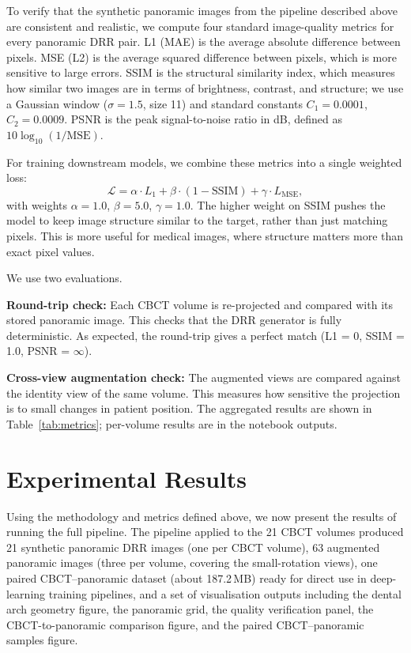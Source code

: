 \documentclass[conference]{IEEEtran}
\begin{document}
To verify that the synthetic panoramic images from the pipeline described above are consistent and realistic, we compute four standard image-quality metrics for every panoramic DRR pair. L1 (MAE) is the average absolute difference between pixels. MSE (L2) is the average squared difference between pixels, which is more sensitive to large errors. SSIM is the structural similarity index, which measures how similar two images are in terms of brightness, contrast, and structure; we use a Gaussian window ($\sigma=1.5$, size 11) and standard constants $C_1 = 0.0001$, $C_2 = 0.0009$. PSNR is the peak signal-to-noise ratio in dB, defined as $10\log_{10}(1/\text{MSE})$.

For training downstream models, we combine these metrics into a single weighted loss:
\begin{equation}
\mathcal{L} = \alpha \cdot L_1 + \beta \cdot (1 - \text{SSIM}) + \gamma \cdot L_\text{MSE},
\label{eq:loss}
\end{equation}
with weights $\alpha=1.0$, $\beta=5.0$, $\gamma=1.0$. The higher weight on SSIM pushes the model to keep image structure similar to the target, rather than just matching pixels. This is more useful for medical images, where structure matters more than exact pixel values.

We use two evaluations.

\textbf{Round-trip check:} Each CBCT volume is re-projected and compared with its stored panoramic image. This checks that the DRR generator is fully deterministic. As expected, the round-trip gives a perfect match (L1 = 0, SSIM = 1.0, PSNR = $\infty$).

\textbf{Cross-view augmentation check:} The augmented views are compared against the identity view of the same volume. This measures how sensitive the projection is to small changes in patient position. The aggregated results are shown in Table~\ref{tab:metrics}; per-volume results are in the notebook outputs.

\section{Experimental Results}
\label{sec:results}

Using the methodology and metrics defined above, we now present the results of running the full pipeline. The pipeline applied to the 21 CBCT volumes produced 21 synthetic panoramic DRR images (one per CBCT volume), 63 augmented panoramic images (three per volume, covering the small-rotation views), one paired CBCT--panoramic dataset (about 187.2\,MB) ready for direct use in deep-learning training pipelines, and a set of visualisation outputs including the dental arch geometry figure, the panoramic grid, the quality verification panel, the CBCT-to-panoramic comparison figure, and the paired CBCT--panoramic samples figure.
\end{document}

